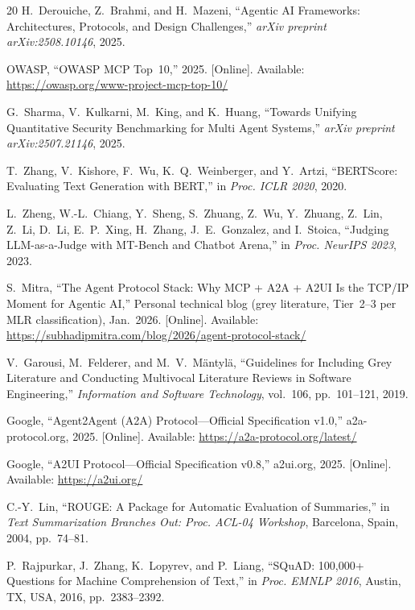 \documentclass[10pt,journal,compsoc]{IEEEtran}
\begin{document}
\begin{thebibliography}{20}
H.~Derouiche, Z.~Brahmi, and H.~Mazeni, ``Agentic AI Frameworks: Architectures,
Protocols, and Design Challenges,'' \emph{arXiv preprint arXiv:2508.10146}, 2025.

OWASP, ``OWASP MCP Top~10,'' 2025. [Online]. Available:
\url{https://owasp.org/www-project-mcp-top-10/}

G.~Sharma, V.~Kulkarni, M.~King, and K.~Huang, ``Towards Unifying Quantitative
Security Benchmarking for Multi Agent Systems,'' \emph{arXiv preprint
arXiv:2507.21146}, 2025.

T.~Zhang, V.~Kishore, F.~Wu, K.~Q.~Weinberger, and Y.~Artzi, ``BERTScore:
Evaluating Text Generation with BERT,'' in \emph{Proc. ICLR 2020}, 2020.

L.~Zheng, W.-L.~Chiang, Y.~Sheng, S.~Zhuang, Z.~Wu, Y.~Zhuang, Z.~Lin,
Z.~Li, D.~Li, E.~P.~Xing, H.~Zhang, J.~E.~Gonzalez, and I.~Stoica, ``Judging
LLM-as-a-Judge with MT-Bench and Chatbot Arena,'' in \emph{Proc. NeurIPS 2023},
2023.

S.~Mitra, ``The Agent Protocol Stack: Why MCP + A2A + A2UI Is the TCP/IP Moment
for Agentic AI,'' Personal technical blog (grey literature, Tier~2--3 per MLR
classification), Jan.~2026. [Online]. Available:
\url{https://subhadipmitra.com/blog/2026/agent-protocol-stack/}

V.~Garousi, M.~Felderer, and M.~V.~M\"{a}ntyl\"{a}, ``Guidelines for Including
Grey Literature and Conducting Multivocal Literature Reviews in Software
Engineering,'' \emph{Information and Software Technology}, vol.~106,
pp.~101--121, 2019.

Google, ``Agent2Agent (A2A) Protocol---Official Specification v1.0,''
a2a-protocol.org, 2025. [Online]. Available: \url{https://a2a-protocol.org/latest/}

Google, ``A2UI Protocol---Official Specification v0.8,'' a2ui.org, 2025. [Online].
Available: \url{https://a2ui.org/}

C.-Y.~Lin, ``ROUGE: A Package for Automatic Evaluation of Summaries,'' in
\emph{Text Summarization Branches Out: Proc. ACL-04 Workshop}, Barcelona, Spain,
2004, pp.~74--81.

P.~Rajpurkar, J.~Zhang, K.~Lopyrev, and P.~Liang, ``SQuAD: 100,000+ Questions
for Machine Comprehension of Text,'' in \emph{Proc. EMNLP 2016}, Austin, TX,
USA, 2016, pp.~2383--2392.

\end{thebibliography}
\end{document}
